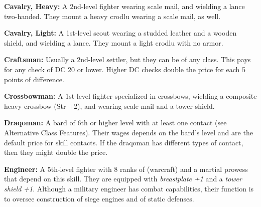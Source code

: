 \textbf{Cavalry, Heavy:} A 2nd-level fighter wearing scale mail, and wielding a lance two-handed. They mount a heavy crodlu wearing a scale mail, as well.

\textbf{Cavalry, Light:} A 1st-level scout wearing a studded leather and a wooden shield, and wielding a lance. They mount a light crodlu with no armor.

\textbf{Craftsman:} Usually a 2nd-level settler, but they can be of any class. This pays for any  check of DC 20 or lower. Higher DC checks double the price for each 5 points of difference. 

\textbf{Crossbowman:} A 1st-level fighter specialized in crossbows, wielding a composite heavy crossbow (Str +2), and wearing scale mail and a tower shield.

\textbf{Draqoman:} A bard of 6th or higher level with at least one contact (see Alternative Class Features). Their wages depends on the bard's level and are the default price for skill contacts. If the draqoman has different types of contact, then they might double the price.

\textbf{Engineer:} A 5th-level fighter with 8 ranks of  (warcraft) and a martial prowess that depend on this skill. They are equipped with \emph{breastplate +1} and a \emph{tower shield +1}. Although a military engineer has combat capabilities, their function is to oversee construction of siege engines and of static defenses.


